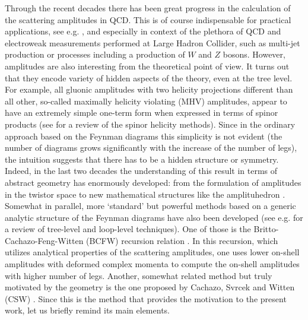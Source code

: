 \documentclass[english,american]{article}
\begin{document}
\label{sec:Intro}


Through the recent decades there has been  great progress in the calculation of the scattering amplitudes in QCD. This is of course indispensable for practical applications, see e.g. \citep{Freitas2016}, and especially in context of the plethora of QCD and electroweak measurements performed at Large Hadron Collider, such as multi-jet production or processes including a production of $W$ and $Z$ bosons. 
However, amplitudes are also interesting  from the theoretical point of view. It turns out that they encode variety of hidden aspects of the theory, even at the tree level.
 For example, all gluonic
amplitudes with two helicity projections different than all other,
so-called maximally helicity violating (MHV) amplitudes, appear to
have an extremely simple one-term form when expressed in terms of spinor
products \citep{Parke:1986gb,Berends:1987me} (see \citep{Mangano:1990by}
for a review of the spinor helicity methods). Since in the ordinary approach
based on the Feynman diagrams this simplicity is  not evident 
(the number of diagrams grows significantly with the increase of the
number of legs), the intuition suggests that there has to be a
hidden structure or symmetry. Indeed, in the last two decades the
understanding of this result in terms of abstract geometry has enormously
developed: from the formulation of amplitudes in the twistor space
\citep{Witten2004} to new mathematical structures like the amplituhedron
\citep{Arkani-Hamed2014}. Somewhat in parallel, more `standard' but
powerful methods based on a generic analytic structure of the Feynman
diagrams have also been developed (see e.g. \citep{Henn} for a review
of tree-level and loop-level techniques). One of those is the Britto-Cachazo-Feng-Witten
(BCFW) recursion relation  \citep{Britto:2004ap,Britto:2005fq}. In this recursion, which utilizes analytical properties of the scattering amplitudes,  one uses lower on-shell amplitudes with deformed complex momenta to compute the on-shell amplitudes with higher number of legs.  Another, somewhat
related method but truly motivated by the geometry is the one proposed
by Cachazo, Svrcek and Witten (CSW) \citep{Cachazo2004}. Since this
is the method that provides the motivation to the present work, let
us briefly remind its main elements.
\end{document}

